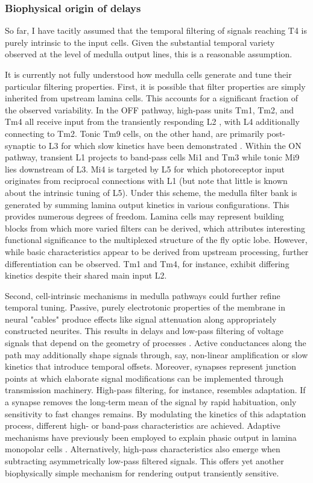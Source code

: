 \subsubsection{Biophysical origin of delays}
So far, I have tacitly assumed that the temporal filtering of signals reaching T4 is purely intrinsic to the input cells. Given the substantial temporal variety observed at the level of medulla output lines, this is a reasonable assumption.

It is currently not fully understood how medulla cells generate and tune their particular filtering properties. First, it is possible that filter properties are simply inherited from upstream lamina cells. This accounts for a significant fraction of the observed variability. In the OFF pathway, high-pass units Tm1, Tm2, and Tm4 all receive input from the transiently responding L2 \citep{Fischbach:1989uw,RiveraAlba:2011dd,Takemura:2017aa}, with L4 additionally connecting to Tm2. Tonic Tm9 cells, on the other hand, are primarily post-synaptic to L3 for which slow kinetics have been demonstrated \citep{Silies:2013jp}. Within the ON pathway, transient L1 projects to band-pass cells Mi1 and Tm3 while tonic Mi9 lies downstream of L3. Mi4 is targeted by L5 for which photoreceptor input originates from reciprocal connections with L1 (but note that little is known about the intrinsic tuning of L5). Under this scheme, the medulla filter bank is generated by summing lamina output kinetics in various configurations. This provides numerous degrees of freedom. Lamina cells may represent building blocks from which more varied filters can be derived, which attributes interesting functional significance to the multiplexed structure of the fly optic lobe. However, while basic characteristics appear to be derived from upstream processing, further differentiation can be observed. Tm1 and Tm4, for instance, exhibit differing kinetics despite their shared main input L2.

Second, cell-intrinsic mechanisms in medulla pathways could further refine temporal tuning. Passive, purely electrotonic properties of the membrane in neural "cables" produce effects like signal attenuation along appropriately constructed neurites. This results in delays and low-pass filtering of voltage signals that depend on the geometry of processes \citep{Koch:2004aa}. Active conductances along the path may additionally shape signals through, say, non-linear amplification or slow kinetics that introduce temporal offsets. Moreover, synapses represent junction points at which elaborate signal modifications can be implemented through transmission machinery. High-pass filtering, for instance, resembles adaptation. If a synapse removes the long-term mean of the signal by rapid habituation, only sensitivity to fast changes remains. By modulating the kinetics of this adaptation process, different high- or band-pass characteristics are achieved. Adaptive mechanisms have previously been employed to explain phasic output in lamina monopolar cells \citep{Laughlin:1978aa}. Alternatively, high-pass characteristics also emerge when subtracting asymmetrically low-pass filtered signals. This offers yet another biophysically simple mechanism for rendering output transiently sensitive.

